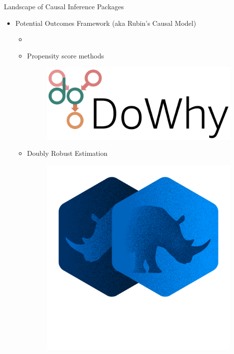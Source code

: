\documentclass{beamer}
\begin{document}
\begin{frame}{Landscape of Causal Inference Packages}
	\begin{itemize}
		\item Potential Outcomes Framework (aka Rubin's Causal Model)
			\begin{itemize}
				\item 
				\item Propensity score methods
					\begin{figure}
						\includegraphics[scale=0.1]{imgs/dowhy.png}
					\end{figure}
				\item Doubly Robust Estimation
					\begin{figure}
						\includegraphics[scale=0.1]{imgs/doubleml.png}
					\end{figure}

\end{itemize}
\end{itemize}
\end{frame}
\end{document}
